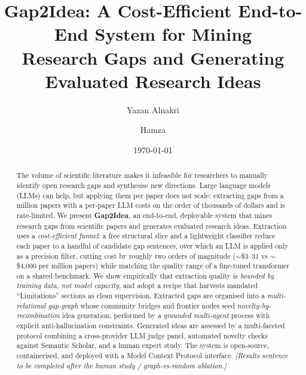 \documentclass[11pt,a4paper]{article}
\title{\textbf{Gap2Idea}: A Cost-Efficient End-to-End System for Mining\\
Research Gaps and Generating Evaluated Research Ideas}
\author{Yazan Alnakri \and Hamza}
\date{\today}
\begin{document}
\maketitle

\begin{abstract}
The volume of scientific literature makes it infeasible for researchers to
manually identify open research gaps and synthesise new directions. Large
language models (LLMs) can help, but applying them per paper does not scale:
extracting gaps from a million papers with a per-paper LLM costs on the order of
thousands of dollars and is rate-limited. We present \textbf{Gap2Idea}, an
end-to-end, deployable system that mines research gaps from scientific papers and
generates evaluated research ideas. Extraction uses a \emph{cost-efficient
funnel}: a free structural slice and a lightweight classifier reduce each paper
to a handful of candidate gap sentences, over which an LLM is applied only as a
precision filter, cutting cost by roughly two orders of magnitude ($\sim$\$3--31
vs $\sim$\$4{,}000 per million papers) while matching the quality range of a
fine-tuned transformer on a shared benchmark. We show empirically that extraction
quality is \emph{bounded by training data, not model capacity}, and adopt a
recipe that harvests mandated ``Limitations'' sections as clean supervision.
Extracted gaps are organised into a \emph{multi-relational gap-graph} whose
community bridges and frontier nodes seed \emph{novelty-by-recombination} idea
generation, performed by a \emph{grounded multi-agent} process with explicit
anti-hallucination constraints. Generated ideas are assessed by a multi-faceted
protocol combining a cross-provider LLM judge panel, automated novelty checks
against Semantic Scholar, and a human expert study. The system is open-source,
containerised, and deployed with a Model Context Protocol interface.
\emph{[Results sentence to be completed after the human study / graph-vs-random
ablation.]}
\end{abstract}

\tableofcontents
\newpage








\end{document}
